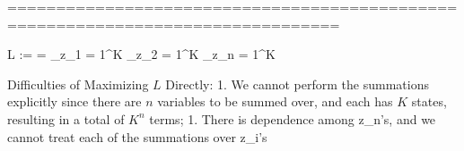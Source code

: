================================================================================

L \parens{\btheta} := \Pr {} = \sum_{z_1 = 1}^K \sum_{z_2 = 1}^K \cdots \sum_{z_n = 1}^K \Pr {}

Difficulties of Maximizing $L$ Directly:
1. We cannot perform the summations explicitly since there are $n$ variables to be summed over, and each has $K$ states, resulting in a total of $K^n$ terms; 
1. There is dependence among z_n's, and we cannot treat each of the summations over z_i's
